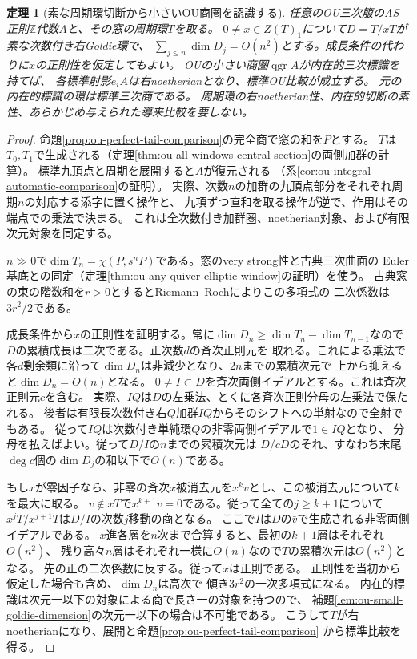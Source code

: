 \documentclass[11pt,a4paper]{ltjsarticle}
\newtheorem{theorem}{定理}[section]
\theoremstyle{definition}
\newcommand{\qgr}{\operatorname{qgr}}
\begin{document}
\begin{theorem}[素な周期環切断から小さいOU商圏を認識する]
\label{thm:ou-literal-prime-window-cut}
任意のOU三次箙のAS正則$\mathbb Z$代数$A$と、その窓の周期環$T$を取る。
$0\ne x\in Z(T)_1$について$D=T/xT$が素な次数付き右Goldie環で、
$\sum_{j\le n}\dim D_j=O(n^2)$とする。成長条件の代わりに$x$の正則性を仮定してもよい。
OUの小さい商圏$\qgr A$が内在的三次標識を持てば、
各標準射影$e_iA$は右noetherianとなり、標準OU比較が成立する。
元の内在的標識の環は標準三次商である。
周期環の右noetherian性、内在的切断の素性、あらかじめ与えられた導来比較を要しない。
\end{theorem}
\begin{proof}
命題\ref{prop:ou-perfect-tail-comparison}の完全商で窓の和を$P$とする。
$T$は$T_0,T_1$で生成される（定理\ref{thm:ou-all-windows-central-section}の両側加群の計算）。
標準九頂点と周期を展開すると$A$が復元される
（系\ref{cor:ou-integral-automatic-comparison}の証明）。
実際、次数$n$の加群の九頂点部分をそれぞれ周期$n$の対応する添字に置く操作と、
九項ずつ直和を取る操作が逆で、作用はその端点での乗法で決まる。
これは全次数付き加群圏、noetherian対象、および有限次元対象を同定する。

$n\gg0$で$\dim T_n=\chi(P,s^nP)$である。窓のvery strong性と古典三次曲面の
Euler基底との同定（定理\ref{thm:ou-any-quiver-elliptic-window}の証明）を使う。
古典窓の束の階数和を$r>0$とするとRiemann--Rochによりこの多項式の
二次係数は$3r^2/2$である。

成長条件から$x$の正則性を証明する。常に$\dim D_n\ge\dim T_n-\dim T_{n-1}$なので
$D$の累積成長は二次である。正次数$d$の斉次正則元を
取れる\cite[\S6, Theorem~6.3の前]{StaffordVdB2001}。これによる乗法で
各$d$剰余類に沿って$\dim D_n$は非減少となり、$2n$までの累積次元で
上から抑えると$\dim D_n=O(n)$となる。
$0\ne I\subset D$を斉次両側イデアルとする。これは斉次正則元$c$を含む。
実際、$IQ$は$D$の左乗法、とくに各斉次正則分母の左乗法で保たれる。
後者は有限長次数付き右$Q$加群$IQ$からそのシフトへの単射なので全射でもある。
従って$IQ$は次数付き単純環$Q$の非零両側イデアルで$1\in IQ$となり、
分母を払えばよい。従って$D/I$の$n$までの累積次元は
$D/cD$のそれ、すなわち末尾$\deg c$個の$\dim D_j$の和以下で$O(n)$である。

もし$x$が零因子なら、非零の斉次$x$被消去元を$x^kv$とし、この被消去元について$k$を最大に取る。
$v\notin xT$で$x^{k+1}v=0$である。従って全ての$j\ge k+1$について
$x^jT/x^{j+1}T$は$D/I$の次数$j$移動の商となる。
ここで$I$は$D$の$\bar v$で生成される非零両側イデアルである。
$x$進各層を$n$次まで合算すると、最初の$k+1$層はそれぞれ$O(n^2)$、
残り高々$n$層はそれぞれ一様に$O(n)$なので$T$の累積次元は$O(n^2)$となる。
先の正の二次係数に反する。従って$x$は正則である。
正則性を当初から仮定した場合も含め、$\dim D_n$は高次で
傾き$3r^2$の一次多項式になる。
内在的標識は次元一以下の対象による商で長さ一の対象を持つので、
補題\ref{lem:ou-small-goldie-dimension}の次元一以下の場合は不可能である。
こうして$T$が右noetherianになり、展開と命題\ref{prop:ou-perfect-tail-comparison}
から標準比較を得る。


\end{proof}
\end{document}
